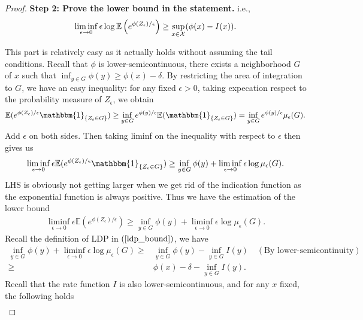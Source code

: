 \documentclass[10pt]{article}
\def\X{{\cal X}}
\newcommand{\e}{\mathbb{E}}
\newenvironment{Proof of lemma}{\noindent{\bf Proof of Lemma}}{\hfill$\Box$\newline}
\newenvironment{Proof of claim}{\noindent{\bf Proof of claim}}{\hfill$\Box$\newline}
\newenvironment{Proof of theorem}{\noindent{\bf Proof of Theorem}}{\hfill\scriptsize{$\Box$}\newline}
\newenvironment{Proof of theorems}{\noindent{\bf Proof of Theorems}}{\hfill$\Box$\newline}
\newenvironment{Proof of proposition}{\noindent{\bf Proof of Proposition}}{\hfill$\Box$\newline}
\newenvironment{Proof of propositions}{\noindent{\bf Proof of Propositions}}{\hfill$\Box$\newline}
\newenvironment{Proof of exercise}{\noindent{\it Proof of Exercise:}}{\hfill$\Box$}
\numberwithin{equation}{section}
\begin{document}
\begin{proof}
    \textbf{Step 2: Prove the lower bound in the statement.} i.e.,
    \begin{align}
        \liminf_{\epsilon \to 0} \epsilon \log \e \left(e^{\phi(Z_{\epsilon})/\epsilon}\right) \geq \sup_{x \in \X}(\phi(x)-I(x)).
    \end{align}

    This part is relatively easy as it actually holds without assuming the tail conditions. Recall that $\phi$ is lower-semicontinuous, there exists a neighborhood $G$ of $x$ such that $\inf_{y \in G} \phi(y) \geq \phi(x) - \delta$. By restricting the area of integration to $G$, we have an easy inequality: for any fixed $\epsilon > 0$, taking expecation respect to the probability measure of $Z_{\epsilon}$, we obtain
    \begin{align}
        \e(e^{\phi(Z_{\epsilon})/\epsilon}\mathbbm{1}_{\{Z_{\epsilon}\in G\}}) \geq \inf_{y \in G}e^{\phi(y)/\epsilon}\e (\mathbbm{1}_{\{Z_{\epsilon}\in G\}}) = \inf_{y \in G}e^{\phi(y)/\epsilon} \mu_{\epsilon}(G).
    \end{align}
    Add $\epsilon$ on both sides. Then taking liminf on the inequality with respect to $\epsilon$ then gives us
    \begin{align}
        \liminf_{\epsilon \to 0} \epsilon \e(e^{\phi(Z_{\epsilon})/\epsilon}\mathbbm{1}_{\{Z_{\epsilon}\in G\}}) \geq \inf_{y \in G} \phi(y) + \liminf_{\epsilon \to 0} \epsilon \log \mu_{\epsilon}(G).
    \end{align}
    LHS is obviously not getting larger when we get rid of the indication function as the exponential function is always positive. Thus we have the estimation of the lower bound
    \begin{align}
        \liminf_{\epsilon \to 0} \epsilon \e(e^{\phi(Z_{\epsilon})/\epsilon}) \geq \inf_{y \in G} \phi(y) + \liminf_{\epsilon \to 0} \epsilon \log \mu_{\epsilon}(G).
    \end{align}
    Recall the definition of LDP in $(\ref{ldp_bound})$, we have
    \begin{align} \label{ldp_lower_last_step}
        \inf_{y \in G} \phi(y) + \liminf_{\epsilon \to 0} \epsilon \log \mu_{\epsilon}(G) \geq&  \inf_{y \in G} \phi(y) - \inf_{y \in G} I(y) \quad(\text{By lower-semicontinuity}) \nonumber \\
        \geq& \phi(x) -\delta - \inf_{y \in G} I(y).
    \end{align}
    Recall that the rate function $I$ is also lower-semicontinuous, and for any $x$ fixed, the following holds
    \begin{align}

\end{align}
\end{proof}
\end{document}
